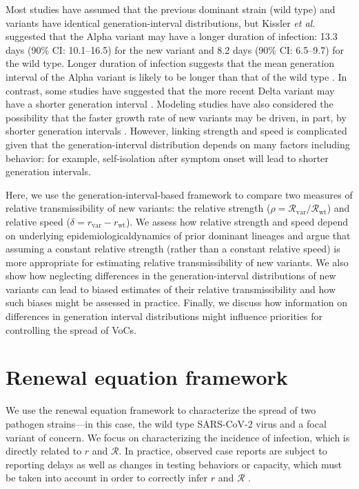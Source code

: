 \documentclass[12pt]{article}
\newcommand{\vvvar}{\mathrm{var}}
\newcommand{\wwwt}{\mathrm{wt}}
\newcommand{\rx}[1]{\ensuremath{{r}_{#1}}\xspace}
\newcommand{\rw}{\rx{\wwwt}}
\newcommand{\rv}{\rx{\vvvar}}
\newcommand{\Rx}[1]{\ensuremath{{\mathcal R}_{#1}}\xspace}
\newcommand{\RR}{\ensuremath{{\mathcal R}}\xspace}
\newcommand{\Rw}{\Rx{\wwwt}}
\newcommand{\Rv}{\Rx{\vvvar}}
\begin{document}
Most studies have assumed that the previous dominant strain (wild type) and variants have identical generation-interval distributions, but Kissler \textit{et al.} \citep{kissler2021densely} suggested that the Alpha variant may have a longer duration of infection: 13.3 days (90\% CI: 10.1--16.5) for the new variant and 8.2 days (90\% CI: 6.5--9.7) for the wild type.
Longer duration of infection suggests that the mean generation interval of the Alpha variant is likely to be longer than that of the wild type \citep{lloyd2001realistic,wearing2005appropriate,roberts2007model}.
In contrast, some studies have suggested that the more recent Delta variant may have a shorter generation interval \citep{li2021viral,zhang2021transmission}.
Modeling studies have also considered the possibility that the faster growth rate of new variants may be driven, in part, by shorter generation intervals \citep{davies2021estimated,volz2021transmission}.
However, linking strength and speed is complicated given that the generation-interval distribution depends on many factors including behavior:
for example, self-isolation after symptom onset will lead to shorter generation intervals.

Here, we use the generation-interval-based framework to compare two measures of relative transmissibility of new variants: the relative strength ($\rho=\Rv/\Rw$) and relative speed ($\delta=\rv-\rw$).
We assess how relative strength and speed depend on underlying epidemiologicaldynamics of prior dominant lineages and argue that assuming a constant relative strength (rather than a constant relative speed) is more appropriate for estimating relative transmissibility of new variants.
We also show how neglecting differences in the generation-interval distributions of new variants can lead to biased estimates of their relative transmissibility and how such biases might be assessed in practice.
Finally, we discuss how information on differences in generation interval distributions might influence priorities for controlling the spread of VoCs.

\section{Renewal equation framework}

We use the renewal equation framework to characterize the spread of two pathogen strains---in this case, the wild type SARS-CoV-2 virus and a focal variant of concern.
We focus on characterizing the incidence of infection, which is directly related to $r$ and $\RR$.
In practice, observed case reports are subject to reporting delays as well as changes in testing behaviors or capacity, which must be taken into account in order to correctly infer $r$ and $\RR$ \citep{goldstein2009reconstructing,gostic2020practical}.
\end{document}
